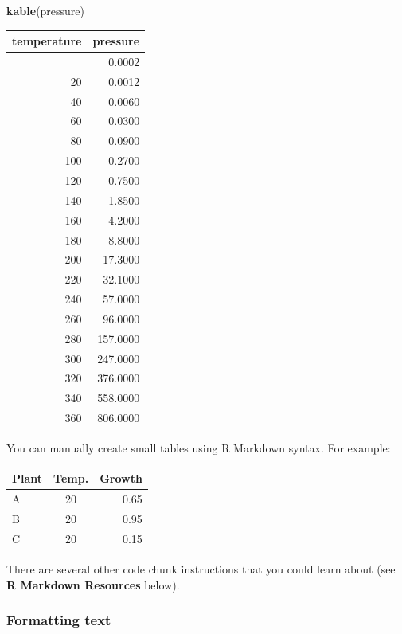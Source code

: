 \documentclass[
]{article}
\newenvironment{Shaded}{\begin{snugshade}}{\end{snugshade}}
\newcommand{\FunctionTok}[1]{\textcolor[rgb]{0.13,0.29,0.53}{\textbf{#1}}}
\newcommand{\NormalTok}[1]{#1}
\begin{document}
\begin{Shaded}
\begin{Highlighting}[]
\FunctionTok{kable}\NormalTok{(pressure)}
\end{Highlighting}
\end{Shaded}

\begin{longtable}[]{@{}rr@{}}
\toprule\noalign{}
temperature & pressure \\
\midrule\noalign{}
\endhead
\bottomrule\noalign{}
\endlastfoot
0 & 0.0002 \\
20 & 0.0012 \\
40 & 0.0060 \\
60 & 0.0300 \\
80 & 0.0900 \\
100 & 0.2700 \\
120 & 0.7500 \\
140 & 1.8500 \\
160 & 4.2000 \\
180 & 8.8000 \\
200 & 17.3000 \\
220 & 32.1000 \\
240 & 57.0000 \\
260 & 96.0000 \\
280 & 157.0000 \\
300 & 247.0000 \\
320 & 376.0000 \\
340 & 558.0000 \\
360 & 806.0000 \\
\end{longtable}

You can manually create small tables using R Markdown syntax. For
example:

\begin{longtable}[]{@{}lcr@{}}
\toprule\noalign{}
Plant & Temp. & Growth \\
\midrule\noalign{}
\endhead
\bottomrule\noalign{}
\endlastfoot
A & 20 & 0.65 \\
B & 20 & 0.95 \\
C & 20 & 0.15 \\
\end{longtable}

There are several other code chunk instructions that you could learn
about (see \textbf{R Markdown Resources} below).

\subsubsection{\texorpdfstring{\textbf{Formatting
text}}{Formatting text}}\label{formatting-text}
\end{document}
